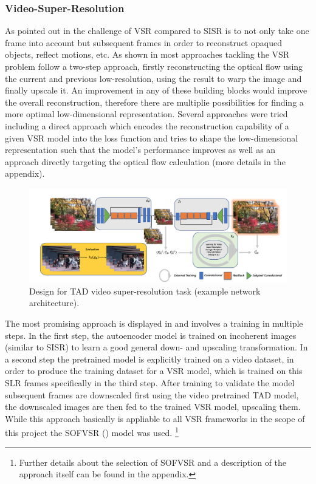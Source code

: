 \subsubsection*{Video-Super-Resolution}
As pointed out in  the challenge of \ac{VSR}
compared to \ac{SISR} is to not only take one frame into account but subsequent
frames in order to reconstruct opaqued objects, reflect motions, etc.
As shown in  most approaches tackling the
\ac{VSR} problem follow a two-step approach, firstly reconstructing the optical
flow using the current and previous low-resolution, using the result to warp
the image and finally upscale it. An improvement in any of these building blocks
would improve the overall reconstruction, therefore there are multiplie
possibilities for finding a more optimal low-dimensional representation. Several
approaches were tried including a direct approach which encodes the
reconstruction capability of a given \ac{VSR} model into the loss function and
tries to shape the low-dimensional representation such that the model's
performance improves as well as an approach directly targeting the optical
flow calculation (more details in the appendix).

\begin{figure}[!htbp]
	\centering
	\includegraphics[width=14cm]{figures/architecture_video_external}
	\caption{Design for \ac{TAD} video super-resolution task (example network
  architecture).}
  \label{fig:architecture_video}
\end{figure}

The most promising approach is displayed in 
and involves a training in multiple steps. In the first step, the autoencoder
model is trained on incoherent images (similar to \ac{SISR}) to learn a good
general down- and upscaling transformation. In a second step the pretrained
model is explicitly trained on a video dataset, in order to produce the
training dataset for a \ac{VSR} model, which is trained on this SLR frames
specifically in the third step. After training to validate the model subsequent
frames are downscaled first using the video pretrained \ac{TAD} model, the
downscaled images are then fed to the trained \ac{VSR} model, upscaling them.
While this approach basically is appliable to all \ac{VSR} frameworks in the
scope of this project the SOFVSR (\cite{LFVSRTHROFE}) model was used.
\footnote{Further details about the selection of SOFVSR and a description of
the approach itself can be found in the appendix.}


